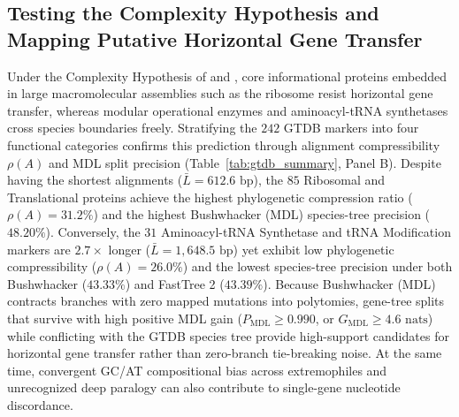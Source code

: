 \documentclass[11pt,a4paper]{article}
\begin{document}
\subsection{Testing the Complexity Hypothesis and Mapping Putative Horizontal Gene Transfer}

Under the Complexity Hypothesis of \citet{jain1999horizontal} and \citet{woese2000aminoacyl}, core informational proteins embedded in large macromolecular assemblies such as the ribosome resist horizontal gene transfer, whereas modular operational enzymes and aminoacyl-tRNA synthetases cross species boundaries freely. Stratifying the $242$ GTDB markers into four functional categories confirms this prediction through alignment compressibility $\rho(A)$ and MDL split precision (Table~\ref{tab:gtdb_summary}, Panel B). Despite having the shortest alignments ($\bar{L} = 612.6\text{ bp}$), the $85$ Ribosomal and Translational proteins achieve the highest phylogenetic compression ratio ($\rho(A) = 31.2\%$) and the highest Bushwhacker (MDL) species-tree precision ($48.20\%$). Conversely, the $31$ Aminoacyl-tRNA Synthetase and tRNA Modification markers are $2.7\times$ longer ($\bar{L} = 1,648.5\text{ bp}$) yet exhibit low phylogenetic compressibility ($\rho(A) = 26.0\%$) and the lowest species-tree precision under both Bushwhacker ($43.33\%$) and FastTree 2 ($43.39\%$). Because Bushwhacker (MDL) contracts branches with zero mapped mutations into polytomies, gene-tree splits that survive with high positive MDL gain ($P_{\text{MDL}} \ge 0.990$, or $G_{\text{MDL}} \ge 4.6\text{ nats}$) while conflicting with the GTDB species tree provide high-support candidates for horizontal gene transfer rather than zero-branch tie-breaking noise. At the same time, convergent GC/AT compositional bias across extremophiles and unrecognized deep paralogy can also contribute to single-gene nucleotide discordance.
\end{document}
